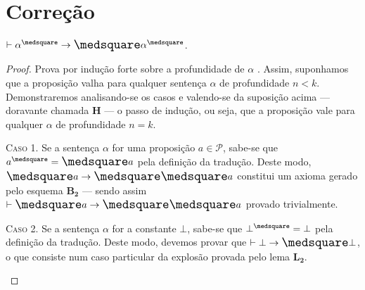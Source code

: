 \section{Correção}

    \begin{theorem}
        $\entails\alpha^\medsquare\to\nec\alpha^\medsquare$.

        \begin{proof}
            Prova por indução forte sobre a profundidade de $\alpha$ \cite{Troelstra}.
            Assim, suponhamos que a proposição valha para qualquer sentença $\alpha$ de profundidade $n<k$.
            Demonstraremos analisando-se os casos e valendo-se da suposição acima --- doravante chamada $\mathbf{H}$ --- o passo de indução, ou seja, que a proposição vale para qualquer $\alpha$ de profundidade $n=k$.

            \begin{case}
                \textsc{Caso 1.}
                Se a sentença $\alpha$ for uma proposição $a\in\mathcal{P}$, sabe-se que $a^\medsquare=\nec a$ pela definição da tradução.
                Deste modo, $\nec{a}\to\nec\nec{a}$ constitui um axioma gerado pelo esquema \hyperref[MB2]{$\mathbf{B_2}$} --- sendo assim $\entails\nec{a}\to\nec\nec{a}$ provado trivialmente.
            \end{case}

            \begin{case}
                \textsc{Caso 2.}
                Se a sentença $\alpha$ for a constante $\bot$, sabe-se que $\bot^\medsquare=\bot$ pela definição da tradução.
                Deste modo, devemos provar que $\entails\bot\to\nec\bot$, o que consiste num caso particular da explosão provada pelo lema \hyperref[explosion]{$\mathbf{L_2}$}.
            \end{case}


\end{proof}
\end{theorem}
